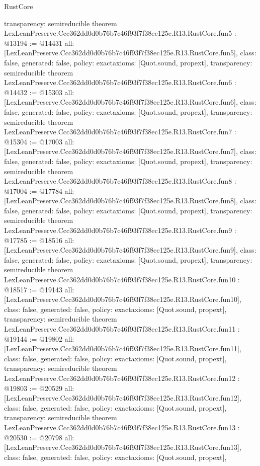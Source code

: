 \begin{lexlean}{RustCore}
\begin{coremodule}
{  transparency: semireducible
}
theorem LexLeanPreserve.Ccc362dd0d0b76b7c46f93f7f38ec125e.R13.RustCore.fun5 : @13194 := @14431 {
  all: [LexLeanPreserve.Ccc362dd0d0b76b7c46f93f7f38ec125e.R13.RustCore.fun5],
  class: false,
  generated: false,
  policy: exact{axioms: [Quot.sound, propext]},
  transparency: semireducible
}
theorem LexLeanPreserve.Ccc362dd0d0b76b7c46f93f7f38ec125e.R13.RustCore.fun6 : @14432 := @15303 {
  all: [LexLeanPreserve.Ccc362dd0d0b76b7c46f93f7f38ec125e.R13.RustCore.fun6],
  class: false,
  generated: false,
  policy: exact{axioms: [Quot.sound, propext]},
  transparency: semireducible
}
theorem LexLeanPreserve.Ccc362dd0d0b76b7c46f93f7f38ec125e.R13.RustCore.fun7 : @15304 := @17003 {
  all: [LexLeanPreserve.Ccc362dd0d0b76b7c46f93f7f38ec125e.R13.RustCore.fun7],
  class: false,
  generated: false,
  policy: exact{axioms: [Quot.sound, propext]},
  transparency: semireducible
}
theorem LexLeanPreserve.Ccc362dd0d0b76b7c46f93f7f38ec125e.R13.RustCore.fun8 : @17004 := @17784 {
  all: [LexLeanPreserve.Ccc362dd0d0b76b7c46f93f7f38ec125e.R13.RustCore.fun8],
  class: false,
  generated: false,
  policy: exact{axioms: [Quot.sound, propext]},
  transparency: semireducible
}
theorem LexLeanPreserve.Ccc362dd0d0b76b7c46f93f7f38ec125e.R13.RustCore.fun9 : @17785 := @18516 {
  all: [LexLeanPreserve.Ccc362dd0d0b76b7c46f93f7f38ec125e.R13.RustCore.fun9],
  class: false,
  generated: false,
  policy: exact{axioms: [Quot.sound, propext]},
  transparency: semireducible
}
theorem LexLeanPreserve.Ccc362dd0d0b76b7c46f93f7f38ec125e.R13.RustCore.fun10 : @18517 := @19143 {
  all: [LexLeanPreserve.Ccc362dd0d0b76b7c46f93f7f38ec125e.R13.RustCore.fun10],
  class: false,
  generated: false,
  policy: exact{axioms: [Quot.sound, propext]},
  transparency: semireducible
}
theorem LexLeanPreserve.Ccc362dd0d0b76b7c46f93f7f38ec125e.R13.RustCore.fun11 : @19144 := @19802 {
  all: [LexLeanPreserve.Ccc362dd0d0b76b7c46f93f7f38ec125e.R13.RustCore.fun11],
  class: false,
  generated: false,
  policy: exact{axioms: [Quot.sound, propext]},
  transparency: semireducible
}
theorem LexLeanPreserve.Ccc362dd0d0b76b7c46f93f7f38ec125e.R13.RustCore.fun12 : @19803 := @20529 {
  all: [LexLeanPreserve.Ccc362dd0d0b76b7c46f93f7f38ec125e.R13.RustCore.fun12],
  class: false,
  generated: false,
  policy: exact{axioms: [Quot.sound, propext]},
  transparency: semireducible
}
theorem LexLeanPreserve.Ccc362dd0d0b76b7c46f93f7f38ec125e.R13.RustCore.fun13 : @20530 := @20798 {
  all: [LexLeanPreserve.Ccc362dd0d0b76b7c46f93f7f38ec125e.R13.RustCore.fun13],
  class: false,
  generated: false,
  policy: exact{axioms: [Quot.sound, propext]},
}
\end{coremodule}
\end{lexlean}
